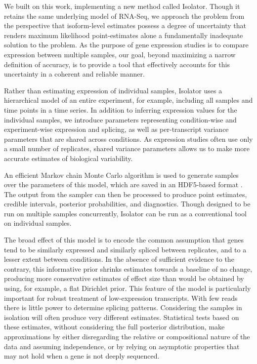 \documentclass[twocolumn]{article}
\begin{document}
We built on this work, implementing a new method called Isolator. Though
it retains the same underlying model of RNA-Seq, we approach the problem
from the perspective that isoform-level estimates possess a degree of
uncertainty that renders maximum likelihood point-estimates alone a
fundamentally inadequate solution to the problem. As the purpose of gene
expression studies is to compare expression between multiple samples,
our goal, beyond maximizing a narrow definition of accuracy, is to
provide a tool that effectively accounts for this uncertainty in a
coherent and reliable manner.

Rather than estimating expression of individual samples, Isolator uses a
hierarchical model of an entire experiment, for example, including all samples
and time points in a time series. In addition to inferring expression values for
the individual samples, we introduce parameters representing condition-wise and
experiment-wise expression and splicing, as well as per-transcript variance
parameters that are shared across conditions. As expression studies often use
only a small number of replicates, shared variance parameters allows us to make
more accurate estimates of biological variability.

An efficient Markov chain Monte Carlo algorithm is used to generate samples over
the parameters of this model, which are saved in an HDF5-based format
\cite{hdf5}. The output from the sampler can then be processed to produce point
estimates, credible intervals, posterior probabilities, and diagnostics. Though
designed to be run on multiple samples concurrently, Isolator can be run as a
conventional tool on individual samples.

The broad effect of this model is to encode the common assumption that
genes tend to be similarly expressed and similarly spliced between
replicates, and to a lesser extent between conditions. In the absence of
sufficient evidence to the contrary, this informative prior shrinks
estimates towards a baseline of no change, producing more conservative
estimates of effect size than would be obtained by using, for example, a
flat Dirichlet prior. This feature of the model is particularly
important for robust treatment of low-expression transcripts. With few reads
there is little power to determine splicing patterns. Considering the
samples in isolation will often produce very different estimates.
Statistical tests based on these estimates, without considering the full
posterior distribution, make approximations by either
disregarding the relative or compositional nature of the data and
assuming independence, or by relying on asymptotic properties that may
not hold when a gene is not deeply sequenced.
\end{document}
